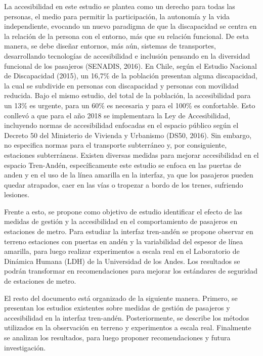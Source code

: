La accesibilidad en este estudio se plantea como un derecho para todas las personas, el medio para permitir la participación, la autonomía y la vida independiente, evocando un nuevo paradigma de que la discapacidad se centra en la relación de la persona con el entorno, más que su relación funcional. De esta manera, se debe diseñar entornos, más aún, sistemas de transportes, desarrollando tecnologías de accesibilidad e inclusión pensando en la diversidad funcional de los pasajeros (SENADIS, 2016). En Chile, según el Estudio Nacional de Discapacidad (2015), un 16,7\% de la población presentan alguna discapacidad, la cual se subdivide en personas con discapacidad y personas con movilidad reducida.  Bajo el mismo estudio, del total de la población, la accesibilidad para un 13\% es urgente, para un 60\% es necesaria y para el 100\% es confortable. Esto conllevó a que para el año 2018 se implementara la Ley de Accesibilidad, incluyendo normas de accesibilidad enfocadas en el espacio público según el Decreto 50 del Ministerio de Vivienda y Urbanismo (DS50, 2016). Sin embargo, no especifica normas para el transporte subterráneo y, por consiguiente, estaciones subterráneas. Existen diversas medidas para mejorar accesibilidad en el espacio Tren-Andén, específicamente este estudio se enfoca en las puertas de anden y en el uso de la línea amarilla en la interfaz, ya que los pasajeros pueden quedar atrapados, caer en las vías o tropezar a bordo de los trenes, sufriendo lesiones.

Frente a esto, se propone como objetivo de estudio identificar el efecto de las medidas de gestión y la accesibilidad en el comportamiento de pasajeros en estaciones de metro. Para estudiar la interfaz tren-andén se propone observar en terreno estaciones con puertas en andén y la variabilidad del espesor de línea amarilla, para luego realizar experimentos a escala real en el Laboratorio de Dinámica Humana (LDH) de la Universidad de los Andes. Los resultados se podrán transformar en recomendaciones para mejorar los estándares de seguridad de estaciones de metro.

El resto del documento está organizado de la siguiente manera. Primero, se presentan los estudios existentes sobre medidas de gestión de pasajeros y accesibilidad en la interfaz tren-andén. Posteriormente, se describe los métodos utilizados en la observación en terreno y experimentos a escala real. Finalmente se analizan los resultados, para luego proponer recomendaciones y futura investigación.
